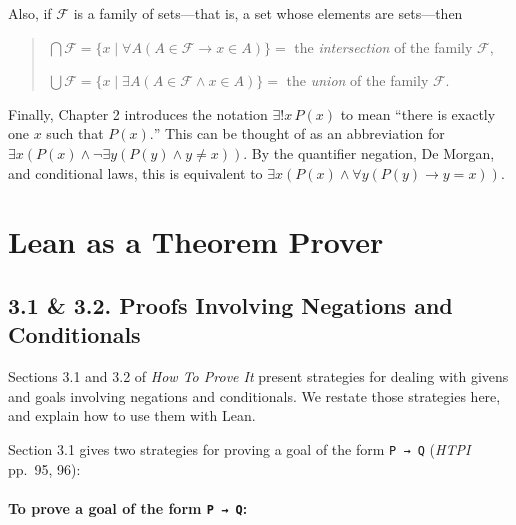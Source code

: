 \documentclass[
  letterpaper,
  DIV=11,
  numbers=noendperiod]{scrreprt}
\theoremstyle{remark}
\begin{document}
Also, if \(\mathcal{F}\) is a family of sets---that is, a set whose
elements are sets---then

\begin{quote}
\(\bigcap \mathcal{F} = \{x \mid \forall A(A \in \mathcal{F} \to x \in A)\} = {}\)
the \emph{intersection} of the family \(\mathcal{F}\),

\(\bigcup \mathcal{F} = \{x \mid \exists A(A \in \mathcal{F} \wedge x \in A)\} = {}\)
the \emph{union} of the family \(\mathcal{F}\).

\end{quote}

Finally, Chapter 2 introduces the notation \(\exists ! x\,P(x)\) to mean
``there is exactly one \(x\) such that \(P(x).\)'' This can be thought
of as an abbreviation for
\(\exists x(P(x) \wedge \neg\exists y(P(y) \wedge y \ne x))\). By the
quantifier negation, De Morgan, and conditional laws, this is equivalent
to \(\exists x(P(x) \wedge \forall y(P(y) \to y = x))\).


\hypertarget{lean-as-a-theorem-prover}{%
\chapter{Lean as a Theorem Prover}\label{lean-as-a-theorem-prover}}

\hypertarget{proofs-involving-negations-and-conditionals}{%
\section{3.1 \& 3.2. Proofs Involving Negations and
Conditionals}\label{proofs-involving-negations-and-conditionals}}

Sections 3.1 and 3.2 of \emph{How To Prove It} present strategies for
dealing with givens and goals involving negations and conditionals. We
restate those strategies here, and explain how to use them with Lean.

Section 3.1 gives two strategies for proving a goal of the form
\texttt{P\ →\ Q} (\emph{HTPI} pp.~95, 96):

\hypertarget{to-prove-a-goal-of-the-form-p-q}{%
\subsubsection{\texorpdfstring{To prove a goal of the form
\texttt{P\ →\ Q}:}{To prove a goal of the form P → Q:}}\label{to-prove-a-goal-of-the-form-p-q}}
\end{document}
